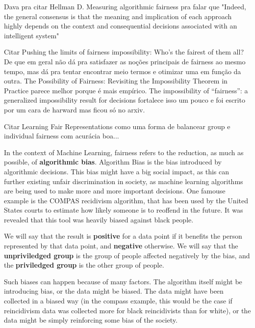 {\color{red} Dava pra citar Hellman D. Measuring algorithmic fairness pra falar que "Indeed, the general consensus is that the meaning and implication of each approach highly depends on the context and consequential decisions associated with an intelligent system"}

{\color{red} Citar Pushing the limits of fairness impossibility: Who’s the fairest of them all? De que em geral não dá pra satisfazer as noções principais de fairness ao mesmo tempo, mas dá pra tentar encontrar meio termos e otimizar uma em função da outra. The Possibility of Fairness: Revisiting the Impossibility Theorem in Practice parece melhor porque é mais empírico. The impossibility of “fairness”: a generalized impossibility result for decisions fortalece isso um pouco e foi escrito por um cara de harward mas ficou só no arxiv.}

{\color{red} Citar Learning Fair Representations como uma forma de balancear group e individual fairness com acurácia boa...}

In the context of Machine Learning, fairness refers to the reduction, as much as possible, of \textbf{algorithmic bias}. Algorithm Bias is the bias introduced by algorithmic decisions. This bias might have a big social impact, as this can further existing unfair discrimination in society, as machine learning algorithms are being used to make more and more important decisions. One famouse example is the COMPAS recidivism algorithm, that has been used by the United States courts to estimate how likely someone is to reoffend in the future. It was revealed \cite{Compass} that this tool was heavily biased against black people. 

We will say that the result is \textbf{positive} for a data point if it benefits the person represented by that data point, and \textbf{negative} otherwise. We will say that the \textbf{unpriviledged group} is the group of people affected negatively by the bias, and the \textbf{priviledged group} is the other group of people.

Such biases can happen because of many factors. The algorithm itself might be introducing bias, or the data might be biased. The data might have been collected in a biased way (in the compass example, this would be the case if reincidivism data was collected more for black reincidivists than for white), or the data might be simply reinforcing some bias of the society. 

